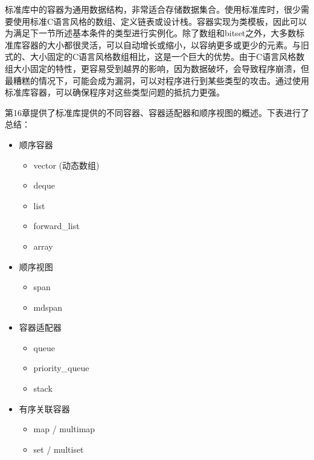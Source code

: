 
标准库中的容器为通用数据结构，非常适合存储数据集合。使用标准库时，很少需要使用标准C语言风格的数组、定义链表或设计栈。容器实现为类模板，因此可以为满足下一节所述基本条件的类型进行实例化。除了数组和bitset之外，大多数标准库容器的大小都很灵活，可以自动增长或缩小，以容纳更多或更少的元素。与旧式的、大小固定的C语言风格数组相比，这是一个巨大的优势。由于C语言风格数组大小固定的特性，更容易受到越界的影响，因为数据破坏，会导致程序崩溃，但最糟糕的情况下，可能会成为漏洞，可以对程序进行到某些类型的攻击。通过使用标准库容器，可以确保程序对这些类型问题的抵抗力更强。

第16章提供了标准库提供的不同容器、容器适配器和顺序视图的概述。下表进行了总结：

\begin{itemize}
\item
顺序容器
\begin{itemize}
\item
vector (动态数组)

\item
deque

\item
list

\item
forward\_list

\item
array
\end{itemize}

\item
顺序视图
\begin{itemize}
\item
span

\item
mdspan
\end{itemize}

\item
容器适配器
\begin{itemize}
\item
queue

\item
priority\_queue

\item
stack
\end{itemize}

\item
有序关联容器
\begin{itemize}
\item
map / multimap

\item
set / multiset
\end{itemize}


\end{itemize}
